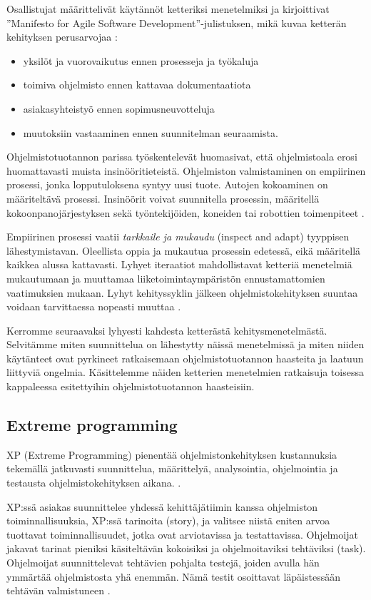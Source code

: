 \documentclass[finnish]{tktltiki2}
\theoremstyle{definition}
\theoremstyle{remark}
\begin{document}
Osallistujat määrittelivät käytännöt ketteriksi menetelmiksi ja kirjoittivat ''Manifesto for Agile Software Development''-julistuksen, mikä kuvaa ketterän kehityksen perusarvojaa \cite{WIC03}:

\begin{itemize}
\item yksilöt ja vuorovaikutus ennen prosesseja ja työkaluja
\item toimiva ohjelmisto ennen kattavaa dokumentaatiota
\item asiakasyhteistyö ennen sopimusneuvotteluja
\item muutoksiin vastaaminen ennen suunnitelman seuraamista.
\end{itemize}

Ohjelmistotuotannon parissa työskentelevät huomasivat, että ohjelmistoala erosi huomattavasti muista insinööritieteistä. Ohjelmiston valmistaminen on empiirinen prosessi, jonka lopputuloksena syntyy uusi tuote. Autojen kokoaminen on määriteltävä prosessi. Insinöörit voivat suunnitella prosessin, määritellä kokoonpanojärjestyksen sekä työntekijöiden, koneiden tai robottien toimenpiteet \cite{WIC03}.

Empiirinen prosessi vaatii \textit{tarkkaile ja mukaudu} (inspect and adapt) tyyppisen lähestymistavan. Oleellista oppia ja mukautua prosessin edetessä, eikä määritellä kaikkea alussa kattavasti.  Lyhyet iteraatiot mahdollistavat ketteriä menetelmiä mukautumaan ja muuttamaa liiketoimintaympäristön ennustamattomien vaatimuksien mukaan. Lyhyt kehityssyklin jälkeen ohjelmistokehityksen suuntaa voidaan tarvittaessa nopeasti muuttaa  \cite{WIC03}.

Kerromme seuraavaksi lyhyesti kahdesta ketterästä kehitysmenetelmästä. Selvitämme miten suunnittelua on lähestytty näissä menetelmissä ja miten niiden käytänteet ovat pyrkineet ratkaisemaan ohjelmistotuotannon haasteita ja laatuun liittyviä ongelmia. Käsittelemme näiden ketterien menetelmien ratkaisuja toisessa kappaleessa esitettyihin ohjelmistotuotannon haasteisiin. 

\subsection{Extreme programming}

XP (Extreme Programming) pienentää ohjelmistonkehityksen kustannuksia tekemällä jatkuvasti suunnittelua, määrittelyä, analysointia, ohjelmointia ja testausta ohjelmistokehityksen aikana.  \cite{BEC99}.

XP:ssä asiakas suunnittelee yhdessä kehittäjätiimin kanssa ohjelmiston toiminnallisuuksia, XP:ssä tarinoita (story), ja valitsee niistä eniten arvoa tuottavat toiminnallisuudet, jotka ovat arviotavissa ja testattavissa. Ohjelmoijat jakavat tarinat pieniksi käsiteltävän kokoisiksi ja ohjelmoitaviksi tehtäviksi (task). Ohjelmoijat suunnittelevat tehtävien pohjalta testejä, joiden avulla hän ymmärtää ohjelmistosta yhä enemmän. Nämä testit osoittavat läpäistessään tehtävän valmistuneen \cite{BEC99}.
\end{document}
